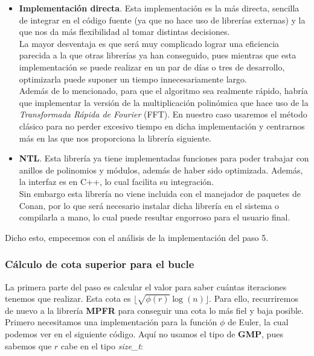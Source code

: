 \begin{itemize}
	\item \textbf{Implementación directa}. Esta implementación es la más directa, sencilla de integrar en el código fuente (ya que no hace uso de librerías externas) y la que nos da más flexibilidad al tomar distintas decisiones.\\
	
	La mayor desventaja es que será muy complicado lograr una eficiencia parecida a la que otras librerías ya han conseguido, pues mientras que esta implementación se puede realizar en un par de días o tres de desarrollo, optimizarla puede suponer un tiempo innecesariamente largo.\\
	
	Además de lo mencionado, para que el algoritmo sea realmente rápido, habría que implementar la versión de la multiplicación polinómica que hace uso de la \textit{Transformada Rápida de Fourier} (FFT). En nuestro caso usaremos el método clásico para no perder excesivo tiempo en dicha implementación y centrarnos más en las que nos proporciona la librería siguiente.
	
	\item \textbf{NTL}. Esta librería ya tiene implementadas funciones para poder trabajar con anillos de polinomios y módulos, además de haber sido optimizada. Además, la interfaz es en C++, lo cual facilita su integración.\\
	
	Sin embargo esta librería no viene incluida con el manejador de paquetes de Conan, por lo que será necesario instalar dicha librería en el sistema o compilarla a mano, lo cual puede resultar engorroso para el usuario final.
\end{itemize}

Dicho esto, empecemos con el análisis de la implementación del paso 5.

\subsubsection{Cálculo de cota superior para el bucle}

La primera parte del paso es calcular el valor para saber cuántas iteraciones tenemos que realizar. Esta cota es $\lfloor \sqrt{\phi(r)}\log(n) \rfloor$. Para ello, recurriremos de nuevo a la librería \textbf{MPFR} para conseguir una cota lo más fiel y baja posible.\\

Primero necesitamos una implementación para la función $\phi$ de Euler, la cual podemos ver en el siguiente código. Aquí no usamos el tipo de \textbf{GMP}, pues sabemos que $r$ cabe en el tipo \textit{size\_t}:\\


